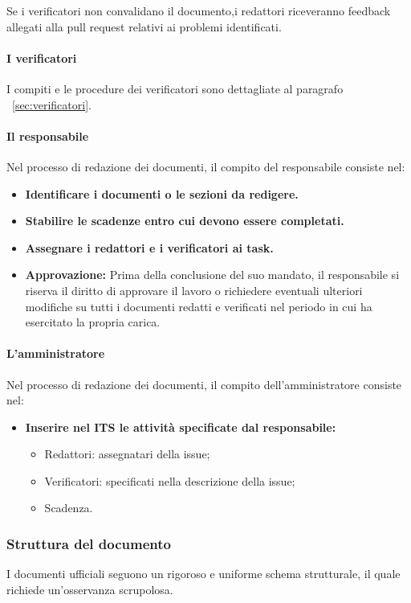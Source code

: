 \documentclass{article}
\begin{document}
    
   Se i verificatori non convalidano il documento,i redattori riceveranno feedback allegati alla pull request relativi ai problemi identificati.
   \paragraph{I verificatori}
   I compiti e le procedure dei verificatori sono dettagliate al paragrafo ~\ref{sec:verificatori}. 
    \paragraph{Il responsabile}
    Nel processo di redazione dei documenti, il compito del responsabile consiste nel: 
        \begin{itemize}
        \item \textbf{Identificare i documenti o le sezioni da redigere. }
        \item \textbf{Stabilire le scadenze entro cui devono essere completati.}
        \item \textbf{Assegnare i redattori e i verificatori ai task.}
        \item \textbf{Approvazione:} Prima della conclusione del suo mandato, il responsabile si riserva il diritto di approvare il lavoro o richiedere eventuali ulteriori modifiche su tutti i documenti redatti e verificati nel periodo in cui ha esercitato la propria carica.
    \end{itemize}
  
    \paragraph{L'amministratore}
     Nel processo di redazione dei documenti, il compito dell'amministratore consiste nel: 
        \begin{itemize}
        \item \textbf{Inserire nel ITS le attività specificate dal responsabile:} \begin{itemize}
            \item Redattori: assegnatari della issue;
            \item Verificatori: specificati nella descrizione della issue;
            \item Scadenza.
        \end{itemize}
    \end{itemize}
    \subsubsection{Struttura del documento}
I documenti ufficiali seguono un rigoroso e uniforme schema strutturale, il quale richiede un'osservanza scrupolosa.
\end{document}
